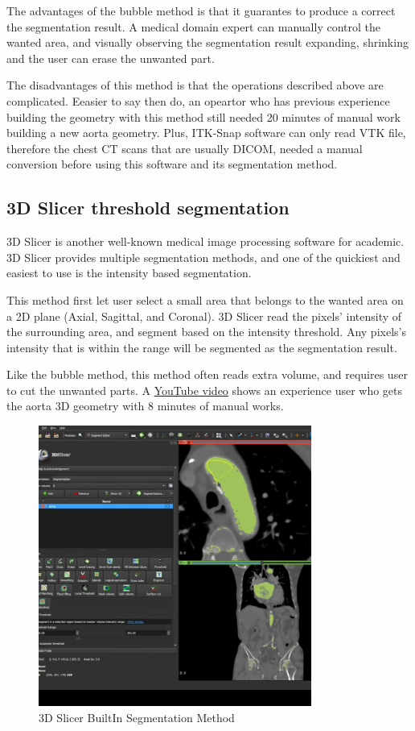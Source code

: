 The advantages of the bubble method is that it guarantes to produce a correct the segmentation result. A medical domain expert can manually control the wanted area, and visually observing the segmentation result expanding, shrinking and the user can erase the unwanted part.

The disadvantages of this method is that the operations described above are complicated. Eeasier to say then do, an opeartor who has previous experience building the geometry with this method still needed 20 minutes of manual work building a new aorta geometry. Plus, ITK-Snap software can only read VTK file, therefore the chest CT scans that are usually DICOM, needed a manual conversion before using this software and its segmentation method.

\subsection{3D Slicer threshold segmentation}
3D Slicer is another well-known medical image processing software for academic. 3D Slicer provides multiple segmentation methods, and one of the quickiest and easiest to use is the intensity based segmentation.

This method first let user select a small area that belongs to the wanted area on a 2D plane (Axial, Sagittal, and Coronal). 3D Slicer read the pixels' intensity of the surrounding area, and segment based on the intensity threshold. Any pixels's intensity that is within the range will be segmented as the segmentation result. 

Like the bubble method, this method often reads extra volume, and requires user to cut the unwanted parts. A \href{https://www.youtube.com/watch?v=5_673cHMBiY}{YouTube video} shows an experience user who gets the aorta 3D geometry with 8 minutes of manual works. 

\begin{figure}[H]
    \centering
    \includegraphics[width=0.8\textwidth]{figures/Sample/3D-Slicer-Segmentation.png}
    \caption[3D Slicer BuiltIn Segmentation UI]{3D Slicer BuiltIn Segmentation Method}
    \label{fig_3D_Seg_Builtin}
\end{figure}

